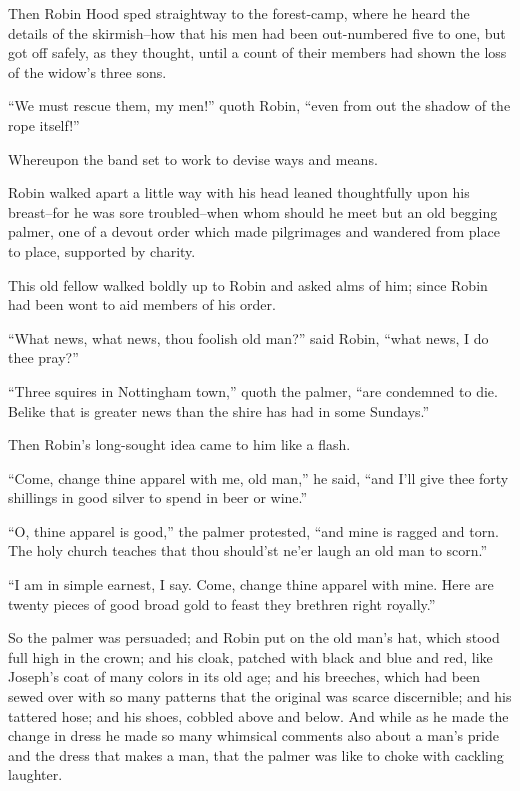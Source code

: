 Then Robin Hood sped straightway to the forest-camp, where he heard the
details of the skirmish--how that his men had been out-numbered five to
one, but got off safely, as they thought, until a count of their members
had shown the loss of the widow's three sons.

``We must rescue them, my men!'' quoth Robin, ``even from out the shadow
of the rope itself!''

Whereupon the band set to work to devise ways and means.

Robin walked apart a little way with his head leaned thoughtfully upon
his breast--for he was sore troubled--when whom should he meet but an
old begging palmer, one of a devout order which made pilgrimages and
wandered from place to place, supported by charity.

This old fellow walked boldly up to Robin and asked alms of him; since
Robin had been wont to aid members of his order.

``What news, what news, thou foolish old man?'' said Robin, ``what news,
I do thee pray?''

``Three squires in Nottingham town,'' quoth the palmer, ``are condemned
to die. Belike that is greater news than the shire has had in some
Sundays.''

Then Robin's long-sought idea came to him like a flash.

``Come, change thine apparel with me, old man,'' he said, ``and I'll
give thee forty shillings in good silver to spend in beer or wine.''

``O, thine apparel is good,'' the palmer protested, ``and mine is ragged
and torn. The holy church teaches that thou should'st ne'er laugh an old
man to scorn.''

``I am in simple earnest, I say. Come, change thine apparel with mine.
Here are twenty pieces of good broad gold to feast they brethren right
royally.''

So the palmer was persuaded; and Robin put on the old man's hat, which
stood full high in the crown; and his cloak, patched with black and blue
and red, like Joseph's coat of many colors in its old age; and his
breeches, which had been sewed over with so many patterns that the
original was scarce discernible; and his tattered hose; and his shoes,
cobbled above and below. And while as he made the change in dress he
made so many whimsical comments also about a man's pride and the dress
that makes a man, that the palmer was like to choke with cackling
laughter.

